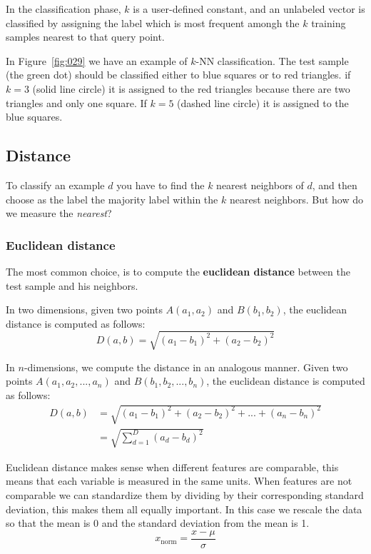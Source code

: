 In the classification phase, \(k\) is a user-defined constant, and an unlabeled vector is classified by assigning the label which is most frequent amongh the \(k\) training samples nearest to that query point.

In Figure~\ref{fig:029} we have an example of \(k\)-NN classification. The test sample (the green dot) should be classified either to blue squares or to red triangles. if \(k=3\) (solid line circle) it is assigned to the red triangles because there are two triangles and only one square. If \(k=5\) (dashed line circle) it is assigned to the blue squares.

\subsection{Distance}
To classify an example \(d\) you have to find the \(k\) nearest neighbors of \(d\), and then choose as the label the majority label within the \(k\) nearest neighbors. But how do we measure the \emph{nearest}?

\subsubsection{Euclidean distance}
The most common choice, is to compute the \textbf{euclidean distance} between the test sample and  his neighbors.

In two dimensions, given two points \(A(a_1, a_2)\) and \(B(b_1, b_2)\), the euclidean distance is computed as follows:
\[D(a,b) = \sqrt{(a_1-b_1)^2 + (a_2-b_2)^2}\]

In \(n\)-dimensions, we compute the distance in an analogous manner. Given two points \(A(a_1, a_2, ..., a_n)\) and \(B(b_1, b_2, ..., b_n)\), the euclidean distance is computed as follows:
\begin{align}
D(a,b)  &= \sqrt{(a_1-b_1)^2 + (a_2-b_2)^2 + ... + (a_n-b_n)^2}\\
        &=\sqrt{\sum_{d=1}^D(a_d-b_d)^2}
\end{align}

Euclidean distance makes sense when different features are comparable, this means that each variable is measured in the same units. When features are not comparable we can standardize them by dividing by their corresponding standard deviation, this makes them all equally important. In this case we rescale the data so that the mean is 0 and the standard deviation from the mean is 1.
\begin{equation*}
    x_\text{norm} = \frac {x - \mu} {\sigma}
\end{equation*}

